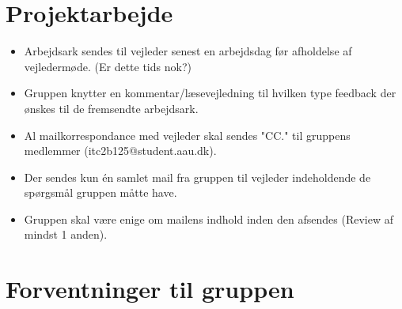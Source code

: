 \documentclass[11pt]{article}
\begin{document}
\section{Projektarbejde}
\begin{itemize}
    \item Arbejdsark sendes til vejleder senest en arbejdsdag før afholdelse af vejledermøde. (Er dette tids nok?)
    \item Gruppen knytter en kommentar/læsevejledning til hvilken type feedback der ønskes til de fremsendte arbejdsark.
    \item Al mailkorrespondance med vejleder skal sendes "CC." til gruppens medlemmer (itc2b125@student.aau.dk).
    \item Der sendes kun én samlet mail fra gruppen til vejleder indeholdende de spørgsmål gruppen måtte have.
    \item Gruppen skal være enige om mailens indhold inden den afsendes (Review af mindst 1 anden).
\end{itemize}

\section{Forventninger til gruppen}
\end{document}
